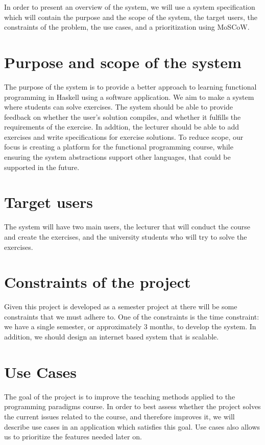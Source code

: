 In order to present an overview of the system, we will use a system specification which will contain the purpose and the scope of the system, the target users, the constraints of the problem, the use cases, and a prioritization using MoSCoW.

\section*{Purpose and scope of the system }
The purpose of the system is to provide a better approach to learning functional programming in Haskell using a software application.
We aim to make a system where students can solve exercises. The system should be able to provide feedback on whether the user's solution compiles, and whether it fulfills the requirements of the exercise. 
In addtion, the lecturer should be able to add exercises and write specifications for exercise solutions.
To reduce scope, our focus is creating a platform for the functional programming course, while ensuring the system abstractions support other languages, that could be supported in the future.

\section*{Target users}
The system will have two main users, the lecturer that will conduct the course and create the exercises, and the university students who will try to solve the exercises.


\section*{Constraints of the project}
Given this project is developed as a semester project at \aau{} there will be some constraints that we must adhere to. 
One of the constraints is the time constraint: we have a single semester, or approximately 3 months, to develop the system. 
In addition, we should design an internet based system that is scalable. 
 
\section*{Use Cases}
The goal of the project is to improve the teaching methods applied to the programming paradigms course. 
In order to best assess whether the project solves the current issues related to the course, and therefore improves it, we will describe use cases in an application which satisfies this goal.
Use cases also allows us to prioritize the features needed later on.

